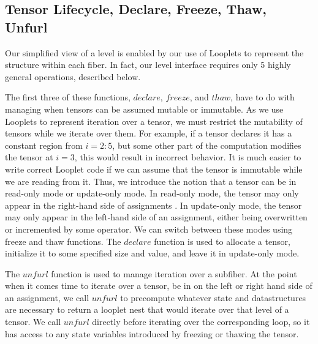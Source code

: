 \subsection{Tensor Lifecycle, Declare, Freeze, Thaw, Unfurl}

Our simplified view of a level is enabled by our use of Looplets to represent
the structure within each fiber.
%
In fact, our level interface requires only 5
highly general operations, described below.

The first three of these functions, $declare$, $freeze$, and $thaw$, have to do with managing when tensors can be assumed mutable or immutable.
%
As we use Looplets to represent iteration over a tensor, we must restrict the mutability of tensors while we iterate over them. 
%
For example, if a tensor declares it has a constant
region from $i = 2:5$, but some other part of the computation modifies the
tensor at $i = 3$, this would result in incorrect behavior.
%
It is much easier to
write correct Looplet code if we can assume that the tensor is immutable while
we are reading from it.
%
Thus, we introduce the notion that a tensor can be in
read-only mode or update-only mode.  
%
In read-only mode, the tensor may only
appear in the right-hand side of assignments
%
. In update-only mode, the tensor
may only appear in the left-hand side of an assignment, either being overwritten
or incremented by some operator. 
%
We can switch between these modes using freeze
and thaw functions.
%
The $declare$ function is used to allocate a tensor,
initialize it to some specified size and value, and leave it in update-only
mode. 

The $unfurl$ function is used to manage iteration over a subfiber. 
%
At the point when it comes time to iterate over a tensor, be in on the left or right hand
side of an assignment, we call $unfurl$ to precompute whatever state
and datastructures are necessary to return a looplet nest that would iterate
over that level of a tensor.
%
We call $unfurl$ directly before
iterating over the corresponding loop, so it has access to any state variables introduced
by freezing or thawing the tensor.

